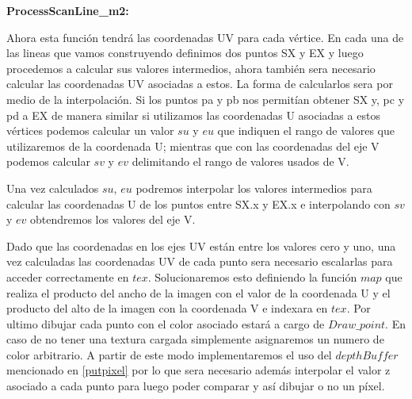 \documentclass[a4paper]{article}
\newcounter{col}
\begin{document}
\textbf{ProcessScanLine\_m2:} 


Ahora esta función tendrá las coordenadas UV para cada vértice. En cada una de las lineas que vamos construyendo definimos dos puntos SX y EX y luego procedemos a calcular sus valores intermedios, ahora también sera necesario calcular las coordenadas UV asociadas a estos. La forma de calcularlos sera por medio de la interpolación. Si los puntos pa y pb nos permitían obtener SX y, pc y pd a EX de manera similar si utilizamos las coordenadas U asociadas a estos vértices podemos calcular un valor $su$ y $eu$ que indiquen el rango de valores que utilizaremos de la coordenada U; mientras que con las coordenadas del eje V podemos calcular $sv$ y $ev$ delimitando el rango de valores usados de V.
\par Una vez calculados $su$, $eu$ podremos interpolar los valores intermedios para calcular las coordenadas U de los puntos entre SX.x y EX.x e interpolando con $sv$ y $ev$ obtendremos los valores del eje V.
\par Dado que las coordenadas en los ejes UV están entre los valores cero y uno, una vez calculadas las coordenadas UV de cada punto sera necesario escalarlas para acceder correctamente en $tex$. Solucionaremos esto definiendo la función $map$ que realiza el producto del ancho de la imagen con el valor de la coordenada U y el producto del alto de la imagen con la coordenada V e indexara en $tex$.
Por ultimo dibujar cada punto con el color asociado estará a cargo de $Draw\_point$. En caso de no tener una textura cargada simplemente asignaremos un numero de color arbitrario.  
A partir de este modo implementaremos el uso del $depthBuffer$ mencionado en \ref{putpixel} por lo que sera necesario además interpolar el valor z asociado a cada punto para luego poder comparar y así dibujar o no un píxel.
 
\end{document}
